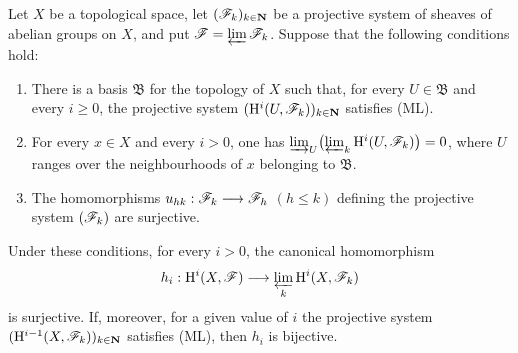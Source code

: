 \begin{proposition}[13.3.1]
\label{0.13.3.1}
Let $X$ be a topological space, let
$(\mathscr{F}_k)_{k\in\mathbf{N}}$ be a projective system of sheaves of
abelian groups on $X$, and put
$\mathscr{F}=\varprojlim\mathscr{F}_k$.
Suppose that the following conditions hold:
\begin{enumerate}
  \item[{\rm(i)}]
  There is a basis $\mathfrak{B}$ for the topology of $X$ such that,
  for every $U\in\mathfrak{B}$ and every $i\geq0$, the projective
  system
  $(\mathrm{H}^i(U,\mathscr{F}_k))_{k\in\mathbf{N}}$ satisfies \textup{(ML)}.

  \item[{\rm(ii)}]
  For every $x\in X$ and every $i>0$, one has $\varinjlim_U\bigl(\varprojlim_k
\mathrm{H}^i(U,\mathscr{F}_k)\bigr)=0$,
  where $U$ ranges over the neighbourhoods of $x$ belonging to
  $\mathfrak{B}$.

  \item[{\rm(iii)}]
  The homomorphisms
  $u_{hk}:\mathscr{F}_k\longrightarrow\mathscr{F}_h$ $(h\leq k)$ defining the
  projective system $(\mathscr{F}_k)$ are surjective.
\end{enumerate}
Under these conditions, for every $i>0$, the canonical homomorphism
\[
  h_i:\mathrm{H}^i(X,\mathscr{F})
  \longrightarrow
  \varprojlim_k\mathrm{H}^i(X,\mathscr{F}_k)
\]
is surjective. If, moreover, for a given value of $i$ the projective
system
$(\mathrm{H}^{i-1}(X,\mathscr{F}_k))_{k\in\mathbf{N}}$ satisfies \textup{(ML)}, then $h_i$ is
bijective.
\end{proposition}

